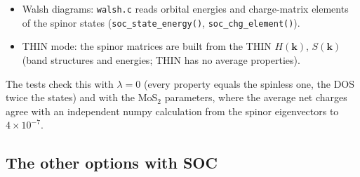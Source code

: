 \documentclass[11pt,a4paper]{article}
\newcommand{\file}[1]{\texttt{#1}}
\newcommand{\fn}[1]{\texttt{#1()}}
\begin{document}
\begin{itemize}
  (one ``$k$ point''), and \fn{soc\_postprocess} prints what \fn{postprocess\_results}
  prints for a molecule: the $2n$ levels with their occupations and the total energy,
  and the populations and charges asked for. The symmetry labels of the MOs are not
  computed (they would need double groups).
\item Walsh diagrams: \file{walsh.c} reads orbital energies and charge-matrix elements of
  the spinor states (\fn{soc\_state\_energy}, \fn{soc\_chg\_element}).
\item THIN mode: the spinor matrices are built from the THIN $H(\mathbf{k})$,
  $S(\mathbf{k})$ (band structures and energies; THIN has no average properties).
\end{itemize}

The tests check this with $\lambda=0$ (every property equals the spinless one, the DOS
twice the states) and with the MoS$_2$ parameters, where the average net charges agree
with an independent numpy calculation from the spinor eigenvectors to $4\times10^{-7}$.

\subsection{The other options with SOC}\label{sec:soclimits}
\end{document}
